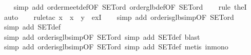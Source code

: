 \begin{isabellebody}
%
\isadelimproof
\ \ %
\endisadelimproof
%
\isatagproof
{}\isamarkupfalse%
\ {}simp\ add{}\ order{}meet{}def{}OF\ SET{}ord{}\ order{}glb{}def{}OF\ SET{}ord{}{}\isanewline
\ \ \isamarkupfalse%
\ {}rule\ the{}I{}{}\isanewline
\ \ \isamarkupfalse%
\ auto\isanewline
\ \ \isamarkupfalse%
\ {}rule{}tac\ x\ {}\ {}x\ {}\ y{}\ \ exI{}\isanewline
\ \ \isamarkupfalse%
\ {}simp\ add{}\ order{}is{}glb{}simp{}OF\ SET{}ord{}{}\isanewline
\ \ \isamarkupfalse%
\ {}simp\ add{}\ SET{}def{}\isanewline
\ \ \isamarkupfalse%
\ {}simp\ add{}\ order{}is{}glb{}simp{}OF\ SET{}ord{}{}\ simp\ add{}\ SET{}def{}\ blast{}\isanewline
\ \ \isamarkupfalse%
\ {}simp\ add{}\ order{}is{}glb{}simp{}OF\ SET{}ord{}{}\ simp\ add{}\ SET{}def{}\ metis\ in{}mono{}\isanewline

\end{isabellebody}
